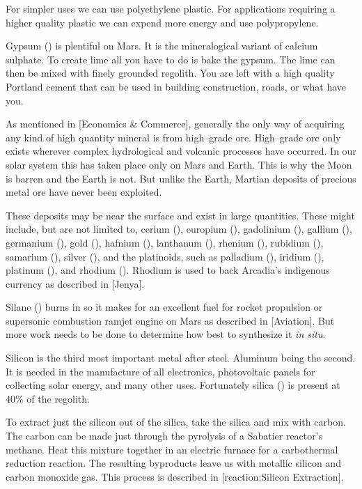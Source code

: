 For simpler uses we can use polyethylene plastic. For applications requiring a higher quality plastic we can expend more energy and use polypropylene.

Gypsum () is plentiful on Mars. It is the mineralogical variant of calcium sulphate. To create lime all you have to do is bake the gypsum. The lime can then be mixed with finely grounded regolith. You are left with a high quality Portland cement that can be used in building construction, roads, or what have you.

As mentioned in [Economics & Commerce], generally the only way of acquiring any kind of high quantity mineral is from high--grade ore. High--grade ore only exists wherever complex hydrological and volcanic processes have occurred. In our solar system this has taken place only on Mars and Earth. This is why the Moon is barren and the Earth is not. But unlike the Earth, Martian deposits of precious metal ore have never been exploited.

These deposits may be near the surface and exist in large quantities. These might include, but are not limited to, cerium (), europium (), gadolinium (), gallium (), germanium (), gold (), hafnium (), lanthanum (), rhenium (), rubidium (), samarium (), silver (), and the platinoids, such as palladium (), iridium (), platinum (), and rhodium (). Rhodium is used to back Arcadia's indigenous currency as described in [Jenya].

Silane () burns in  so it makes for an excellent fuel for rocket propulsion or supersonic combustion ramjet engine on Mars as described in [Aviation]. But more work needs to be done to determine how best to synthesize it {\it in situ}.

Silicon is the third most important metal after steel. Aluminum being the second. It is needed in the manufacture of all electronics, photovoltaic panels for collecting solar energy, and many other uses. Fortunately silica () is present at 40\% of the regolith.

To extract just the silicon out of the silica, take the silica and mix with carbon. The carbon can be made just through the pyrolysis of a Sabatier reactor's methane. Heat this mixture together in an electric furnace for a carbothermal reduction reaction. The resulting byproducts leave us with metallic silicon and carbon monoxide gas. This process is described in [reaction:Silicon Extraction]. 

